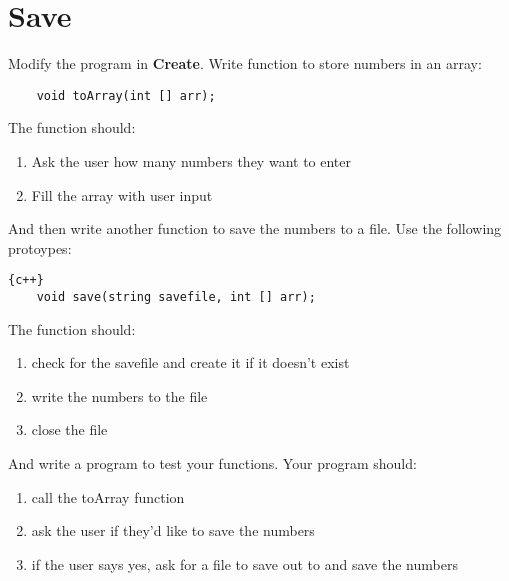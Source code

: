 \documentclass{article}
\begin{document}
\section*{Save}
Modify the program in \textbf{Create}. Write function to store numbers in an array:
\begin{lstlisting}
	void toArray(int [] arr);
\end{lstlisting}
The function should:
\begin{enumerate}
	\item Ask the user how many numbers they want to enter
	\item Fill the array with user input
\end{enumerate}

 And then write another function to save the numbers to a file. Use the following protoypes:
\begin{lstlisting}{c++}
	void save(string savefile, int [] arr);
\end{lstlisting}
The function should:
\begin{enumerate}
	\item check for the savefile and create it if it doesn't exist
	\item write the numbers to the file
	\item close the file
\end{enumerate}
And write a program to test your functions. Your program should:
\begin{enumerate}
	\item call the toArray function
	\item ask the user if they'd like to save the numbers
	\item if the user says yes, ask for a file to save out to and save the numbers
\end{enumerate}
\end{document}
